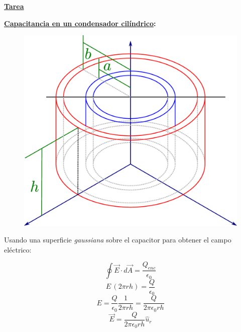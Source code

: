 \documentclass[letter,11pt]{article}
\begin{document}
\begin{center}
    {\Large \bf{\underline{Tarea}}}
\end{center}

\textbf{\underline{Capacitancia en un condensador cilíndrico}:} \\

\begin{figure}[!h]
\centering
\includegraphics[scale=0.15]{resources/f1.eps}
\end{figure}
\vspace{0.5cm}

Usando una superficie \emph{gaussiana} sobre el capacitor para obtener el campo
eléctrico:

\begin{equation*}
    \oint\vec{E}\cdot d\vec{A}=\frac{Q_{enc}}{\epsilon_0}
\end{equation*}
\begin{equation*}
    E\,(2\pi r h)=\frac{Q}{\epsilon_0}
\end{equation*}
\begin{equation*}
    E=\frac{Q}{\epsilon_0}\frac{1}{2\pi r h}
     =\frac{Q}{2\pi\epsilon_0 r h}
\end{equation*}
\begin{equation*}
    \vec{E}=\frac{Q}{2\pi\epsilon_0 r h}\hat{u}_r
\end{equation*}
\vspace{0.5cm}
\end{document}

